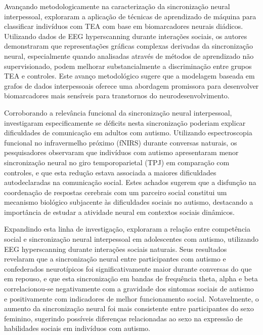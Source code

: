 Avançando metodologicamente na caracterização da sincronização neural interpessoal,  exploraram a aplicação de técnicas de aprendizado de máquina para classificar indivíduos com TEA com base em biomarcadores neurais diádicos. Utilizando dados de EEG hyperscanning durante interações sociais, os autores demonstraram que representações gráficas complexas derivadas da sincronização neural, especialmente quando analisadas através de métodos de aprendizado não supervisionado, podem melhorar substancialmente a discriminação entre grupos TEA e controles. Este avanço metodológico sugere que a modelagem baseada em grafos de dados interpessoais oferece uma abordagem promissora para desenvolver biomarcadores mais sensíveis para transtornos do neurodesenvolvimento.

Corroborando a relevância funcional da sincronização neural interpessoal,  investigaram especificamente se déficits nesta sincronização poderiam explicar dificuldades de comunicação em adultos com autismo. Utilizando espectroscopia funcional no infravermelho próximo (fNIRS) durante conversas naturais, os pesquisadores observaram que indivíduos com autismo apresentaram menor sincronização neural no giro temporoparietal (TPJ) em comparação com controles, e que esta redução estava associada a maiores dificuldades autodeclaradas na comunicação social. Estes achados sugerem que a disfunção na coordenação de respostas cerebrais com um parceiro social constitui um mecanismo biológico subjacente às dificuldades sociais no autismo, destacando a importância de estudar a atividade neural em contextos sociais dinâmicos.

Expandindo esta linha de investigação,  exploraram a relação entre competência social e sincronização neural interpessoal em adolescentes com autismo, utilizando EEG hyperscanning durante interações sociais naturais. Seus resultados revelaram que a sincronização neural entre participantes com autismo e confederados neurotípicos foi significativamente maior durante conversas do que em repouso, e que esta sincronização em bandas de frequência theta, alpha e beta correlacionou-se negativamente com a gravidade dos sintomas sociais de autismo e positivamente com indicadores de melhor funcionamento social. Notavelmente, o aumento da sincronização neural foi mais consistente entre participantes do sexo feminino, sugerindo possíveis diferenças relacionadas ao sexo na expressão de habilidades sociais em indivíduos com autismo.

